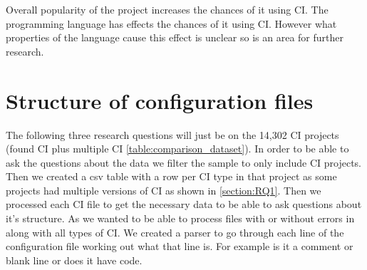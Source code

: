 \documentclass[twoside,12pt,titlepage,a4paper]{article}
\begin{document}
Overall popularity of the project increases the chances of it using CI. The programming language has effects the chances of it using CI. However what properties of the language cause this effect is unclear so is an area for further research.


 
\pagebreak
\section{Structure of configuration files}

The following three research questions will just be on the 14,302 CI projects (found CI plus multiple CI \ref{table:comparison_dataset}). In order to be able to ask the questions about the data we filter the sample to only include CI projects. Then we created a csv table with a row per CI type in that project as some projects had multiple versions of CI as shown in \ref{section:RQ1}. Then we processed each CI file to get the necessary data to be able to ask questions about it's structure. As we wanted to be able to process files with or without errors in along with all types of CI. We created a parser to go through each line of the configuration file working out what that line is. For example is it a comment or blank line or does it have code. 


\vspace*{-0.05in}
\end{document}

